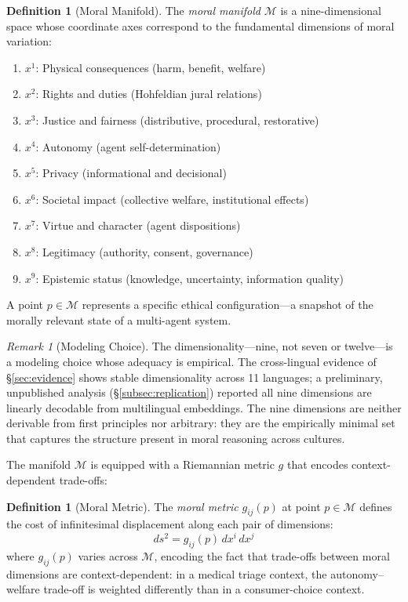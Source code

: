 \documentclass[12pt]{article}
\theoremstyle{definition}
\newtheorem{definition}[theorem]{Definition}
\theoremstyle{remark}
\newtheorem{remark}[theorem]{Remark}
\newcommand{\M}{\mathcal{M}}
\begin{document}
\begin{definition}[Moral Manifold]
\label{def:moral_manifold}
The \emph{moral manifold} $\M$ is a nine-dimensional space whose coordinate axes correspond to the fundamental dimensions of moral variation:
\begin{enumerate}
    \item $x^1$: Physical consequences (harm, benefit, welfare)
    \item $x^2$: Rights and duties (Hohfeldian jural relations)
    \item $x^3$: Justice and fairness (distributive, procedural, restorative)
    \item $x^4$: Autonomy (agent self-determination)
    \item $x^5$: Privacy (informational and decisional)
    \item $x^6$: Societal impact (collective welfare, institutional effects)
    \item $x^7$: Virtue and character (agent dispositions)
    \item $x^8$: Legitimacy (authority, consent, governance)
    \item $x^9$: Epistemic status (knowledge, uncertainty, information quality)
\end{enumerate}
A point $p \in \M$ represents a specific ethical configuration---a snapshot of the morally relevant state of a multi-agent system.
\end{definition}

\begin{remark}[Modeling Choice]
The dimensionality---nine, not seven or twelve---is a modeling choice whose adequacy is empirical. The cross-lingual evidence of \S\ref{sec:evidence} shows stable dimensionality across 11 languages; a preliminary, unpublished analysis (\S\ref{subsec:replication}) reported all nine dimensions are linearly decodable from multilingual embeddings. The nine dimensions are neither derivable from first principles nor arbitrary: they are the empirically minimal set that captures the structure present in moral reasoning across cultures.
\end{remark}

The manifold $\M$ is equipped with a Riemannian metric $g$ that encodes context-dependent trade-offs:

\begin{definition}[Moral Metric]
The \emph{moral metric} $g_{ij}(p)$ at point $p \in \M$ defines the cost of infinitesimal displacement along each pair of dimensions:
\begin{equation}
ds^2 = g_{ij}(p)\, dx^i\, dx^j
\label{eq:metric}
\end{equation}
where $g_{ij}(p)$ varies across $\M$, encoding the fact that trade-offs between moral dimensions are context-dependent: in a medical triage context, the autonomy--welfare trade-off is weighted differently than in a consumer-choice context.
\end{definition}
\end{document}
